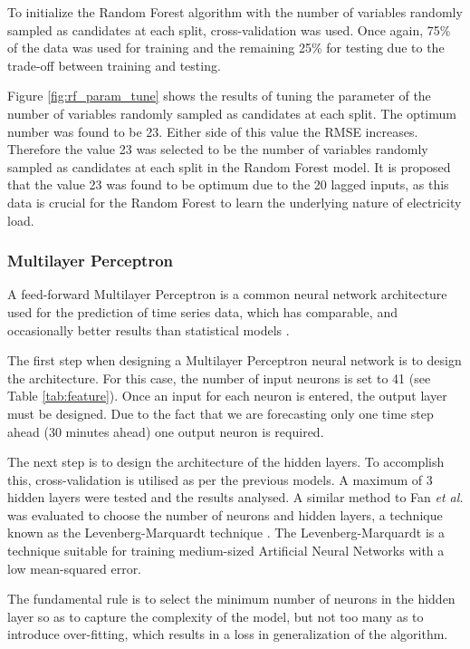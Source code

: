 To initialize the Random Forest algorithm with the number of variables randomly sampled as candidates at each split, cross-validation was used. Once again, 75\% of the data was used for training and the remaining 25\% for testing due to the trade-off between training and testing.

Figure \ref{fig:rf_param_tune} shows the results of tuning the parameter of the number of variables randomly sampled as candidates at each split. The optimum number was found to be 23. Either side of this value the RMSE increases. Therefore the value 23 was selected to be the number of variables randomly sampled as candidates at each split in the Random Forest model. It is proposed that the value 23 was found to be optimum due to the 20 lagged inputs, as this data is crucial for the Random Forest to learn the underlying nature of electricity load.


\subsubsection{Multilayer Perceptron}

A feed-forward Multilayer Perceptron is a common neural network architecture used for the prediction of time series data, which has comparable, and occasionally better results than statistical models \cite{Hill1994}. 

The first step when designing a Multilayer Perceptron neural network is to design the architecture. For this case, the number of input neurons is set to 41 (see Table \ref{tab:feature}). Once an input for each neuron is entered, the output layer must be designed. Due to the fact that we are forecasting only one time step ahead (30 minutes ahead) one output neuron is required.

The next step is to design the architecture of the hidden layers. To accomplish this, cross-validation is utilised as per the previous models. A maximum of 3 hidden layers were tested and the results analysed. A similar method to Fan \textit{et al.} was evaluated to choose the number of neurons and hidden layers, a technique known as the Levenberg-Marquardt technique \cite{Fan2009}. The Levenberg-Marquardt is a technique suitable for training medium-sized Artificial Neural Networks with a low mean-squared error. 

The fundamental rule is to select the minimum number of neurons in the hidden layer so as to capture the complexity of the model, but not too many as to introduce over-fitting, which results in a loss in generalization of the algorithm.


